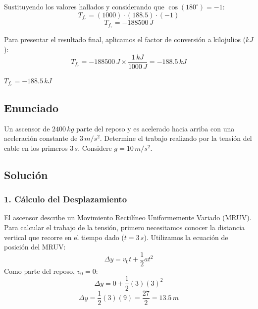 \documentclass[12pt, a4paper]{article}
\begin{document}
Sustituyendo los valores hallados y considerando que $\cos(180^\circ) = -1$:
$$T_{f_r} = (1000) \cdot (188.5) \cdot (-1)$$
$$T_{f_r} = -188500 \, \si{J}$$

Para presentar el resultado final, aplicamos el factor de conversión a kilojulios ($\si{kJ}$):
$$T_{f_r} = -188500 \, \si{J} \times \frac{1 \, \si{kJ}}{1000 \, \si{J}} = -188.5 \, \si{kJ}$$

\begin{tcolorbox}[colback=green!5!white, colframe=green!50!black, title=Respuesta Final]
\centering \Large $T_{f_r} = -188.5 \, \si{kJ}$
\end{tcolorbox}

\newpage

\subsection*{Enunciado}
Un ascensor de $2400 \, \si{kg}$ parte del reposo y es acelerado hacia arriba con una aceleración constante de $3 \, \si{m/s^2}$. Determine el trabajo realizado por la tensión del cable en los primeros $3 \, \si{s}$. Considere $g = 10 \, \si{m/s^2}$.

\begin{center}
\end{center}

\subsection*{Solución}

\subsubsection*{1. Cálculo del Desplazamiento}
El ascensor describe un Movimiento Rectilíneo Uniformemente Variado (MRUV). Para calcular el trabajo de la tensión, primero necesitamos conocer la distancia vertical que recorre en el tiempo dado ($t = 3 \, \si{s}$).
Utilizamos la ecuación de posición del MRUV:
$$ \Delta y = v_0 t + \frac{1}{2} a t^2 $$
Como parte del reposo, $v_0 = 0$:
$$ \Delta y = 0 + \frac{1}{2} (3) (3)^2 $$
$$ \Delta y = \frac{1}{2} (3) (9) = \frac{27}{2} = 13.5 \, \si{m} $$
\end{document}
